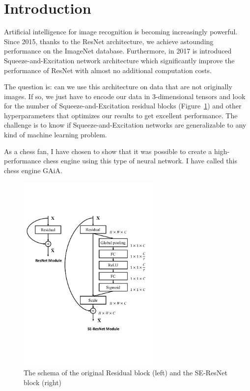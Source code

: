 \documentclass[unnumsec,webpdf,contemporary,large]{Article}%
\theoremstyle{thmstyleone}%
\theoremstyle{thmstyletwo}%
\theoremstyle{thmstylethree}%
\begin{document}
\section{Introduction}

Artificial intelligence for image recognition is becoming
increasingly powerful. Since 2015, thanks to the ResNet\cite{resnet}
architecture, we achieve astounding performance on the ImageNet database.
Furthermore, in 2017 is introduced Squeeze-and-Excitation\cite{squeezeandexcitation}
network architecture which significantly
improve the performance of ResNet with almost no additional computation costs.

The question is: can we use this architecture on data that are not
originally images. If so, we just have to encode our data in 3-dimensional
tensors and look for the number of Squeeze-and-Excitation residual
blocks (Figure~\ref{fig:seblock}) and other hyperparameters
that optimizes our results to get excellent performance.
The challenge is to know if Squeeze-and-Excitation networks are
generalizable to any kind of machine learning problem.

As a chess fan, I have chosen to show that it was possible to create a
high-performance chess engine using this type of neural network.
I have called this chess engine GAiA.

\begin{figure}[H]
  \centering
  \includegraphics[width=7cm]{module_seresnet.pdf}
  \caption{The schema of the original Residual block (left) and the SE-ResNet
  block (right)}
  \label{fig:seblock}
\end{figure}
\end{document}
